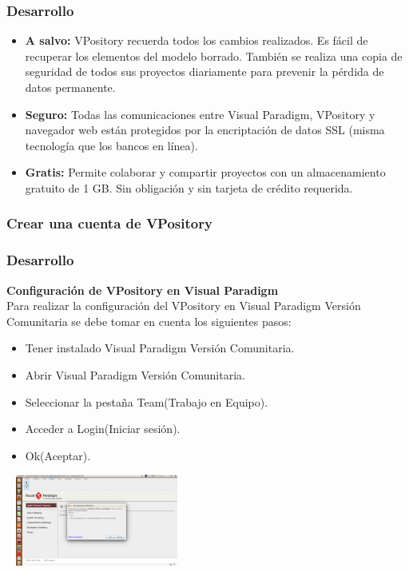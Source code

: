 \documentclass[8pt]{beamer}
\begin{document}
\begin{frame}
\frametitle{Desarrollo}

\begin{center}
\begin{itemize}
\item{\textbf{A salvo:} VPository recuerda todos los cambios realizados. Es fácil de recuperar los elementos del modelo borrado. También se realiza una copia de seguridad de todos sus proyectos diariamente para prevenir la pérdida de datos permanente.}
\item{\textbf{Seguro:} Todas las comunicaciones entre Visual Paradigm, VPository y navegador web están protegidos por la encriptación de datos SSL (misma tecnología que los bancos en línea).}
\item{\textbf{Gratis:} Permite colaborar y compartir proyectos con un almacenamiento gratuito de 1 GB. Sin obligación y sin tarjeta de crédito requerida.}

\end{itemize}

\end{center}
\end{frame}



\subsubsection{Crear una cuenta de VPository}
\begin{frame}
\frametitle{Desarrollo}

\setlength{\parskip}{10pt}
\textbf{Configuración de VPository en Visual Paradigm}\\

\setlength{\parskip}{15pt}
Para realizar la configuración del VPository en Visual Paradigm Versión Comunitaria se debe tomar en cuenta los siguientes pasos:
\begin{center}

\setlength{\parskip}{5pt}
\begin{itemize}
\item{Tener instalado Visual Paradigm Versión Comunitaria.}
\item{Abrir Visual Paradigm Versión Comunitaria.}
\item{Seleccionar la pestaña Team(Trabajo en Equipo).}
\item{Acceder a Login(Iniciar sesión).}
\item{Ok(Aceptar).}
\end{itemize} 

\setlength{\parskip}{08pt}
\includegraphics[width=6cm, height=3cm]{img/cap1}\\
\end{center}
\end{frame}
\end{document}
